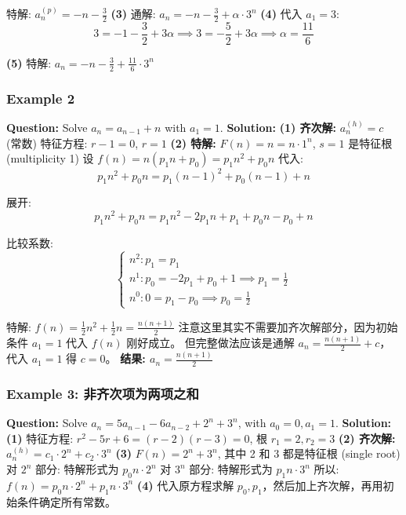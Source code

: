 \documentclass[10pt,a4paper,openany]{ctexbook}
\theoremstyle{definition}
\theoremstyle{remark}
\begin{document}
特解: $a_n^{(p)} = -n - \frac{3}{2}$
\textbf{(3)} 通解: $a_n = -n - \frac{3}{2} + \alpha \cdot 3^n$
\textbf{(4)} 代入 $a_1 = 3$:
\[
3 = -1 - \frac{3}{2} + 3\alpha \implies 3 = -\frac{5}{2} + 3\alpha \implies \alpha = \frac{11}{6}
\]

\textbf{(5)} 特解: $a_n = -n - \frac{3}{2} + \frac{11}{6} \cdot 3^n$
\vspace{-2pt}

\subsubsection{Example 2}

\textbf{Question:} Solve $a_n = a_{n-1} + n$ with $a_1 = 1$.
\textbf{Solution:}
\textbf{(1) 齐次解:} $a_n^{(h)} = c$ (常数)
特征方程: $r - 1 = 0$, $r = 1$
\textbf{(2) 特解:}
$F(n) = n = n \cdot 1^n$, $s = 1$ 是特征根 (multiplicity 1)
设 $f(n) = n(p_1 n + p_0) = p_1 n^2 + p_0 n$
代入:
\[
p_1 n^2 + p_0 n = p_1 (n-1)^2 + p_0 (n-1) + n
\]

展开:
\[
p_1 n^2 + p_0 n = p_1 n^2 - 2p_1 n + p_1 + p_0 n - p_0 + n
\]

比较系数:
\[
\begin{cases}
n^2: p_1 = p_1 \\
n^1: p_0 = -2p_1 + p_0 + 1 \implies p_1 = \frac{1}{2} \\
n^0: 0 = p_1 - p_0 \implies p_0 = \frac{1}{2}
\end{cases}
\]

特解: $f(n) = \frac{1}{2}n^2 + \frac{1}{2}n = \frac{n(n+1)}{2}$
注意这里其实不需要加齐次解部分，因为初始条件 $a_1 = 1$ 代入 $f(n)$ 刚好成立。
但完整做法应该是通解 $a_n = \frac{n(n+1)}{2} + c$，代入 $a_1 = 1$ 得 $c = 0$。
\textbf{结果: $a_n = \frac{n(n+1)}{2}$}
\vspace{-2pt}

\subsubsection{Example 3: 非齐次项为两项之和}

\textbf{Question:} Solve $a_n = 5a_{n-1} - 6a_{n-2} + 2^n + 3^n$, with $a_0 = 0, a_1 = 1$.
\textbf{Solution:}
\textbf{(1)} 特征方程: $r^2 - 5r + 6 = (r-2)(r-3) = 0$, 根 $r_1 = 2, r_2 = 3$
\textbf{(2) 齐次解:} $a_n^{(h)} = c_1 \cdot 2^n + c_2 \cdot 3^n$
\textbf{(3)} $F(n) = 2^n + 3^n$, 其中 2 和 3 都是特征根 (single root)
对 $2^n$ 部分: 特解形式为 $p_0 n \cdot 2^n$
对 $3^n$ 部分: 特解形式为 $p_1 n \cdot 3^n$
所以: $f(n) = p_0 n \cdot 2^n + p_1 n \cdot 3^n$
\textbf{(4)} 代入原方程求解 $p_0, p_1$，然后加上齐次解，再用初始条件确定所有常数。
\vspace{-2pt}
\end{document}
